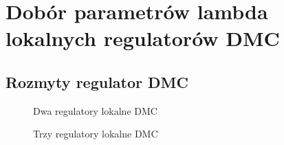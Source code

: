 \section{Dobór parametrów lambda lokalnych regulatorów DMC}
\label{projekt:zad7}

\subsection{Rozmyty regulator DMC}
\label{projekt:zad6:PID}

\begin{figure}[H] 
   \centering
   
   \caption{Dwa regulatory lokalne DMC}
   \label{projekt:zad7:DMC:2:figure}
\end{figure}

\begin{figure}[H] 
   \centering
   
   \caption{Trzy regulatory lokalne DMC}
   \label{projekt:zad7:DMC:3:figure}
\end{figure}
\newpage
